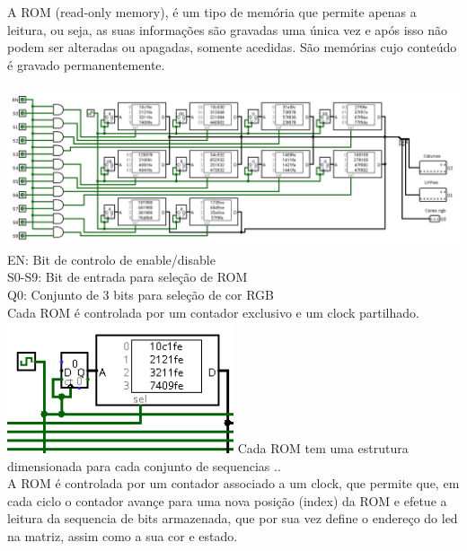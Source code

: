\documentclass[12pt,a4paper,portrait]{article}
\begin{document}
			A ROM (read-only memory), é um tipo de memória que permite apenas a leitura, ou seja, as suas informações são gravadas uma única vez e após isso não podem ser alteradas ou apagadas, somente acedidas. São memórias cujo conteúdo é gravado permanentemente.\\\\
			\includegraphics[width=1.0\textwidth]{imagens/romr1}
			EN: Bit de controlo de enable/disable\\
			S0-S9: Bit de entrada para seleção de ROM\\
			Q0: Conjunto de 3 bits para seleção de cor RGB\\
			Cada ROM é controlada por um contador exclusivo e um clock partilhado.\\
			\includegraphics[width=0.5\textwidth]{imagens/rom1}
			Cada ROM tem uma estrutura dimensionada para cada conjunto de sequencias ..\\
			A ROM é controlada por um contador associado a um clock, que permite que, em cada ciclo o contador avançe para uma nova posição (index) da ROM e efetue a leitura da sequencia de bits armazenada, que por sua vez define o endereço do led na matriz, assim como a sua cor e estado.\\
\end{document}

